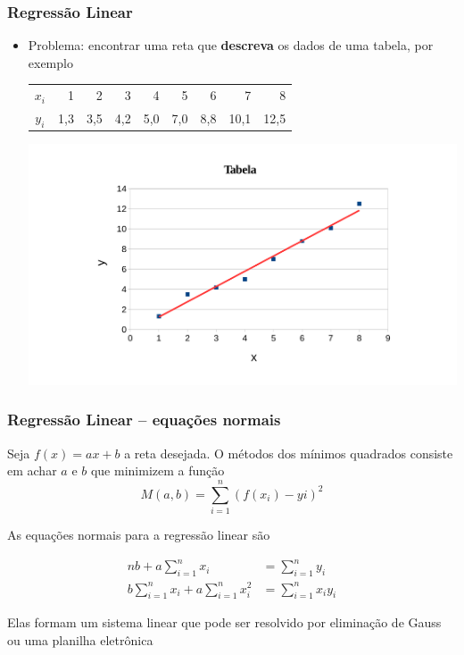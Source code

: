 \begin{frame}
    \frametitle{Regressão Linear}

    \begin{itemize}
        \item Problema: encontrar uma reta que \textbf{descreva} os dados de uma tabela, por exemplo
            \begin{center}
                \begin{tabular}{c|rrrrrrrr}
                    \(x_i\) & 1 & 2 & 3 & 4 & 5 & 6 & 7 & 8 \\
                    \(y_i\) & 1,3 & 3,5 & 4,2 & 5,0 & 7,0 & 8,8 & 10,1 & 12,5
                \end{tabular}

                \includegraphics[height=\textheight-75pt]{images/tab-2}
            \end{center}
    \end{itemize}
\end{frame}

\begin{frame}
    \frametitle{Regressão Linear -- equações normais}
    Seja \(f(x) = ax + b\) a reta desejada. O métodos dos mínimos quadrados consiste em achar \(a\) e \(b\) que minimizem a função
    \[
        M(a,b) = \sum_{i=1}^n {\left(f(x_i) - yi\right)^2}
    \]

    \pause

    As equações normais para a regressão linear são

    \begin{align*}
        n b + a \sum_{i=1}^{n} {x_i} &= \sum_{i=1}^{n} {y_i} \\
        b \sum_{i=1}^{n} {x_i} + a \sum_{i=1}^{n} {x_i^2} &= \sum_{i=1}^{n} {x_iy_i}
    \end{align*}

    Elas formam um sistema linear que pode ser resolvido por eliminação de Gauss ou uma planilha eletrônica

\end{frame}

